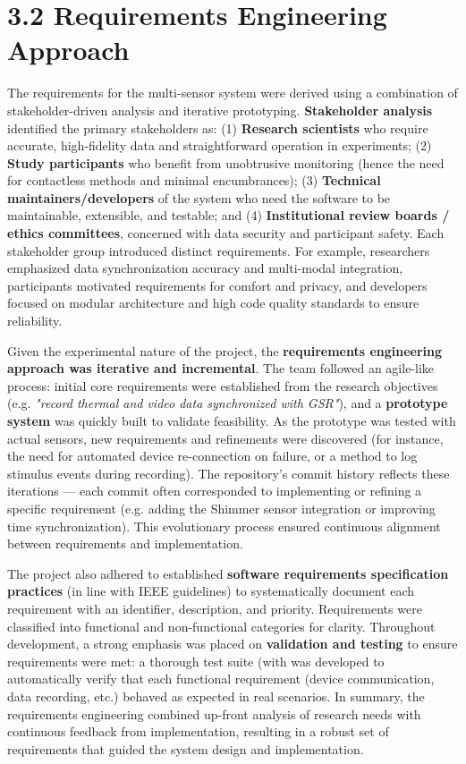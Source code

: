 \documentclass[11pt,a4paper]{report}
\begin{document}
\section{3.2 Requirements Engineering Approach}

The requirements for the multi-sensor system were derived using a
combination of stakeholder-driven analysis and iterative prototyping.
\textbf{Stakeholder analysis} identified the primary stakeholders as: (1)
\textbf{Research scientists} who require accurate, high-fidelity data and
straightforward operation in experiments; (2) \textbf{Study participants} who
benefit from unobtrusive monitoring (hence the need for contactless
methods and minimal encumbrances); (3) \textbf{Technical
maintainers/developers} of the system who need the software to be
maintainable, extensible, and testable; and (4) \textbf{Institutional review
boards / ethics committees}, concerned with data security and
participant safety. Each stakeholder group introduced distinct
requirements. For example, researchers emphasized data synchronization
accuracy and multi-modal integration, participants motivated
requirements for comfort and privacy, and developers focused on modular
architecture and high code quality standards to ensure reliability.

Given the experimental nature of the project, the \textbf{requirements
engineering approach was iterative and incremental}. The team followed
an agile-like process: initial core requirements were established from
the research objectives (e.g. \textit{"record thermal and video data
synchronized with GSR"}), and a \textbf{prototype system} was quickly built
to validate feasibility. As the prototype was tested with actual
sensors, new requirements and refinements were discovered (for instance,
the need for automated device re-connection on failure, or a method to
log stimulus events during recording). The repository's commit history
reflects these iterations --- each commit often corresponded to
implementing or refining a specific requirement (e.g. adding the Shimmer
sensor integration or improving time synchronization). This evolutionary
process ensured continuous alignment between requirements and
implementation.

The project also adhered to established \textbf{software requirements
specification practices} (in line with IEEE guidelines) to
systematically document each requirement with an identifier,
description, and priority. Requirements were classified into functional
and non-functional categories for clarity. Throughout development, a
strong emphasis was placed on \textbf{validation and testing} to ensure
requirements were met: a thorough test suite (with %
was developed to automatically verify that each functional requirement
(device communication, data recording, etc.) behaved as expected in real
scenarios. In summary, the requirements engineering combined up-front
analysis of research needs with continuous feedback from implementation,
resulting in a robust set of requirements that guided the system design
and implementation.
\end{document}
